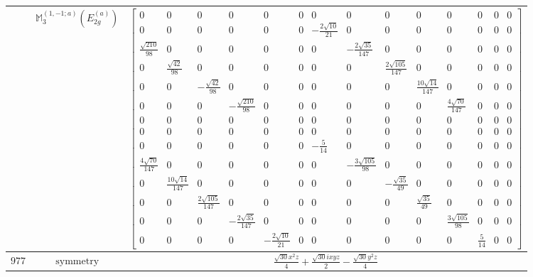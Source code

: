 \documentclass[fleqn,8pt,landscape]{jsarticle}
\begin{document}
\begin{longtable}{ccc}
$  $ & $ \mathbb{M}_{3}^{(1,-1;a)}(E_{2g}^{(a)}) $ & $ \begin{bmatrix} 0 & 0 & 0 & 0 & 0 & 0 & 0 & 0 & 0 & 0 & 0 & 0 & 0 & 0 \\ 0 & 0 & 0 & 0 & 0 & 0 & - \frac{2 \sqrt{10}}{21} & 0 & 0 & 0 & 0 & 0 & 0 & 0 \\ \frac{\sqrt{210}}{98} & 0 & 0 & 0 & 0 & 0 & 0 & - \frac{2 \sqrt{35}}{147} & 0 & 0 & 0 & 0 & 0 & 0 \\ 0 & \frac{\sqrt{42}}{98} & 0 & 0 & 0 & 0 & 0 & 0 & \frac{2 \sqrt{105}}{147} & 0 & 0 & 0 & 0 & 0 \\ 0 & 0 & - \frac{\sqrt{42}}{98} & 0 & 0 & 0 & 0 & 0 & 0 & \frac{10 \sqrt{14}}{147} & 0 & 0 & 0 & 0 \\ 0 & 0 & 0 & - \frac{\sqrt{210}}{98} & 0 & 0 & 0 & 0 & 0 & 0 & \frac{4 \sqrt{70}}{147} & 0 & 0 & 0 \\ 0 & 0 & 0 & 0 & 0 & 0 & 0 & 0 & 0 & 0 & 0 & 0 & 0 & 0 \\ 0 & 0 & 0 & 0 & 0 & 0 & 0 & 0 & 0 & 0 & 0 & 0 & 0 & 0 \\ 0 & 0 & 0 & 0 & 0 & 0 & - \frac{5}{14} & 0 & 0 & 0 & 0 & 0 & 0 & 0 \\ \frac{4 \sqrt{70}}{147} & 0 & 0 & 0 & 0 & 0 & 0 & - \frac{3 \sqrt{105}}{98} & 0 & 0 & 0 & 0 & 0 & 0 \\ 0 & \frac{10 \sqrt{14}}{147} & 0 & 0 & 0 & 0 & 0 & 0 & - \frac{\sqrt{35}}{49} & 0 & 0 & 0 & 0 & 0 \\ 0 & 0 & \frac{2 \sqrt{105}}{147} & 0 & 0 & 0 & 0 & 0 & 0 & \frac{\sqrt{35}}{49} & 0 & 0 & 0 & 0 \\ 0 & 0 & 0 & - \frac{2 \sqrt{35}}{147} & 0 & 0 & 0 & 0 & 0 & 0 & \frac{3 \sqrt{105}}{98} & 0 & 0 & 0 \\ 0 & 0 & 0 & 0 & - \frac{2 \sqrt{10}}{21} & 0 & 0 & 0 & 0 & 0 & 0 & \frac{5}{14} & 0 & 0 \end{bmatrix} $ \\ \hline
$ 977 $ & $ \text{symmetry} $ & $ \frac{\sqrt{30} x^{2} z}{4} + \frac{\sqrt{30} i x y z}{2} - \frac{\sqrt{30} y^{2} z}{4} $ \\

\end{longtable}
\end{document}
